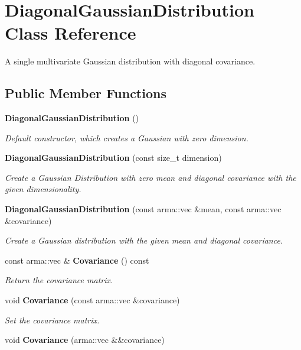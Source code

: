 \section{Diagonal\+Gaussian\+Distribution Class Reference}
\label{classmlpack_1_1distribution_1_1DiagonalGaussianDistribution}


A single multivariate Gaussian distribution with diagonal covariance.  


\subsection*{Public Member Functions}
\begin{DoxyCompactItemize}
\item 
\textbf{ Diagonal\+Gaussian\+Distribution} ()
\begin{DoxyCompactList}\small\item\em Default constructor, which creates a Gaussian with zero dimension. \end{DoxyCompactList}\item 
\textbf{ Diagonal\+Gaussian\+Distribution} (const size\+\_\+t dimension)
\begin{DoxyCompactList}\small\item\em Create a Gaussian Distribution with zero mean and diagonal covariance with the given dimensionality. \end{DoxyCompactList}\item 
\textbf{ Diagonal\+Gaussian\+Distribution} (const arma\+::vec \&mean, const arma\+::vec \&covariance)
\begin{DoxyCompactList}\small\item\em Create a Gaussian distribution with the given mean and diagonal covariance. \end{DoxyCompactList}\item 
const arma\+::vec \& \textbf{ Covariance} () const
\begin{DoxyCompactList}\small\item\em Return the covariance matrix. \end{DoxyCompactList}\item 
void \textbf{ Covariance} (const arma\+::vec \&covariance)
\begin{DoxyCompactList}\small\item\em Set the covariance matrix. \end{DoxyCompactList}\item 
void \textbf{ Covariance} (arma\+::vec \&\&covariance)

\end{DoxyCompactItemize}
